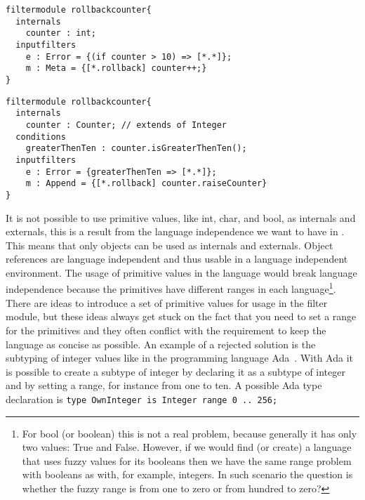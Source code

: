 \begin{lstlisting}[caption = {A filter module with a primitive value}, label = lst::ARM:int:example3,
style = listing, language =ComposeStar, float = tpb]
filtermodule rollbackcounter{
  internals
    counter : int;
  inputfilters
    e : Error = {(if counter > 10) => [*.*]};
    m : Meta = {[*.rollback] counter++;}
}  
\end{lstlisting}
\begin{lstlisting}[caption = {A filter module with an object instead of primitive value}, label = lst::ARM:int:example4,
style = listing, language =ComposeStar, float = tpb]
filtermodule rollbackcounter{
  internals
    counter : Counter; // extends of Integer
  conditions
    greaterThenTen : counter.isGreaterThenTen();
  inputfilters
    e : Error = {greaterThenTen => [*.*]};
    m : Append = {[*.rollback] counter.raiseCounter}
}
\end{lstlisting}
It is not possible to use primitive values, like int, char, and bool, as internals and externals,
this is a result from the language independence
we want to have in \Compose*. 
This means that only objects can be used as internals and externals.
Object references are language independent and thus usable in
a language independent environment.
The usage of primitive values in the language
would break language independence because the primitives have different ranges in each 
language\footnote{For bool (or boolean) this is not a real problem, because generally it has only
two values: True and False. However, if we would find (or create) a language that uses fuzzy
values for its booleans then we have the same range problem with booleans as with, for example, integers.
In such scenario the question is whether the fuzzy range is from one to zero or from hundred to zero?}.
There are ideas to introduce a set of primitive values for usage in the filter module,
but these ideas always get stuck on the fact that you need to set a range for the primitives
and they often conflict with the requirement to keep the language as concise as possible.
An example of a rejected solution is the subtyping of integer values like in the programming language Ada~\cite{Ada95}. With Ada it is possible to create a subtype of integer by declaring
it as a subtype of integer and by setting a range, for instance from one to ten.
A possible Ada type declaration is \lstinline|type OwnInteger is Integer range 0 .. 256;|

